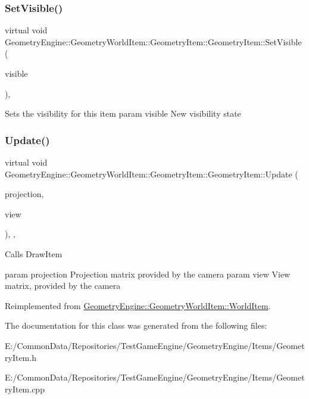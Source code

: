 \subsubsection{\texorpdfstring{SetVisible()}{SetVisible()}}
{\footnotesize\ttfamily virtual void Geometry\+Engine\+::\+Geometry\+World\+Item\+::\+Geometry\+Item\+::\+Geometry\+Item\+::\+Set\+Visible (\begin{DoxyParamCaption}\item[{bool}]{visible }\end{DoxyParamCaption})\hspace{0.3cm}{\ttfamily [inline]}, {\ttfamily [virtual]}}

Sets the visibility for this item param visible New visibility state \mbox{\label{class_geometry_engine_1_1_geometry_world_item_1_1_geometry_item_1_1_geometry_item_aa07c13861cf4aef269442071e4150389}} 
\subsubsection{\texorpdfstring{Update()}{Update()}}
{\footnotesize\ttfamily virtual void Geometry\+Engine\+::\+Geometry\+World\+Item\+::\+Geometry\+Item\+::\+Geometry\+Item\+::\+Update (\begin{DoxyParamCaption}\item[{const Q\+Matrix4x4 \&}]{projection,  }\item[{const Q\+Matrix4x4 \&}]{view }\end{DoxyParamCaption})\hspace{0.3cm}{\ttfamily [inline]}, {\ttfamily [override]}, {\ttfamily [virtual]}}

Calls Draw\+Item

param projection Projection matrix provided by the camera param view View matrix, provided by the camera 

Reimplemented from \mbox{\hyperlink{class_geometry_engine_1_1_geometry_world_item_1_1_world_item_aa6e82e5d95ae34d0addb991cd84aca6f}{Geometry\+Engine\+::\+Geometry\+World\+Item\+::\+World\+Item}}.



The documentation for this class was generated from the following files\+:\begin{DoxyCompactItemize}
\item 
E\+:/\+Common\+Data/\+Repositories/\+Test\+Game\+Engine/\+Geometry\+Engine/\+Items/Geometry\+Item.\+h\item 
E\+:/\+Common\+Data/\+Repositories/\+Test\+Game\+Engine/\+Geometry\+Engine/\+Items/Geometry\+Item.\+cpp\end{DoxyCompactItemize}
